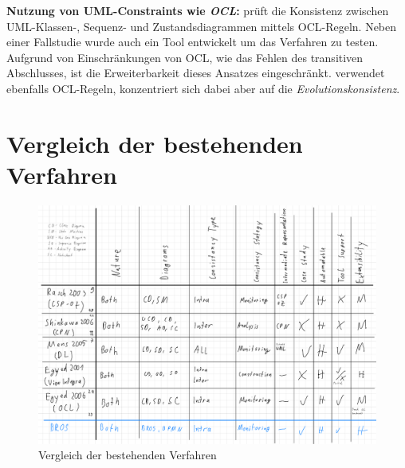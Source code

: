 \textbf{Nutzung von UML-Constraints wie \emph{OCL}:}
\cite{Egyed2006} prüft die Konsistenz zwischen UML-Klassen-, Sequenz- und Zustandsdiagrammen mittels OCL-Regeln.
Neben einer Fallstudie wurde auch ein Tool entwickelt um das Verfahren zu testen.
Aufgrund von Einschränkungen von OCL, wie das Fehlen des transitiven Abschlusses, ist die Erweiterbarkeit dieses Ansatzes eingeschränkt.
\cite{Briand2003} verwendet ebenfalls OCL-Regeln, konzentriert sich dabei aber auf die \emph{Evolutionskonsistenz}.

\section{Vergleich der bestehenden Verfahren}

\begin{figure}
    \includegraphics[width=\textwidth,keepaspectratio]{../images/Klassifikationsschema.pdf}%
    \caption{Vergleich der bestehenden Verfahren}%
    \label{fig:klassifikationsschema}
\end{figure}

